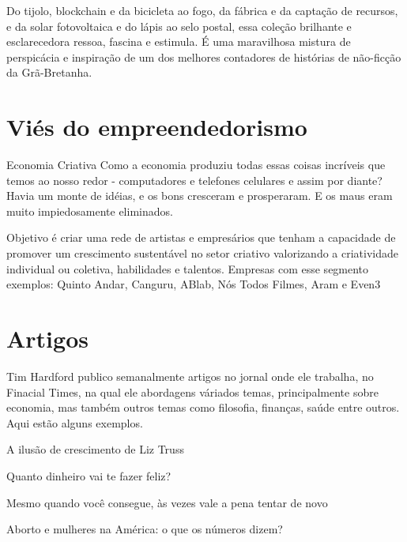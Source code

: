 Do tijolo, blockchain e da bicicleta ao fogo, da fábrica e da captação de recursos, e da solar fotovoltaica e do lápis ao selo postal, essa coleção brilhante e esclarecedora ressoa, fascina e estimula. É uma maravilhosa mistura de perspicácia e inspiração de um dos melhores contadores de histórias de não-ficção da Grã-Bretanha.

\section{Viés do empreendedorismo}\label{sec:exemplo-de-algoritmos-e-figuras}
Economia Criativa
Como a economia produziu todas essas coisas incríveis que temos ao nosso redor - computadores e telefones celulares e assim por diante? Havia um monte de idéias, e os bons cresceram e prosperaram. E os maus eram muito impiedosamente eliminados.

Objetivo é criar uma rede de artistas e empresários que tenham a capacidade de promover um crescimento sustentável no setor criativo valorizando a criatividade individual ou coletiva, habilidades e talentos.
Empresas com esse segmento exemplos: Quinto Andar, Canguru, ABlab, Nós Todos Filmes, Aram e Even3


\section{Artigos}
\label{sec:Artigos}

Tim Hardford publico semanalmente artigos no jornal onde ele trabalha, no Finacial Times, na qual ele abordagens váriados temas, principalmente sobre economia, mas também outros temas como filosofia, finanças, saúde entre outros. Aqui estão alguns exemplos.

A ilusão de crescimento de  Liz Truss 

Quanto dinheiro vai te fazer feliz?

Mesmo quando você consegue, às vezes vale a pena tentar de novo

Aborto e mulheres na América: o que os números dizem?

